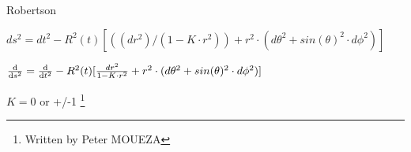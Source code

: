 \documentclass{article}
\date{1st february 1966}
\begin{document}





Robertson

$ds^2=dt^2-R^2(t)[((dr^2)/(1-K \cdot r^2))+r^2 \cdot (d\theta^2+sin(\theta)^2 \cdot d\phi ^2)]$

$\dv{s^2} = \dv{t^2} -R^2(t)[\frac{dr^2}{1-K \cdot r^2}+r^2 \cdot (d\theta^2+sin(\theta)^2 \cdot d\phi ^2)] \quad$

$K=0$  or +/-1
\footnote{Written by Peter MOUEZA}
\end{document}
